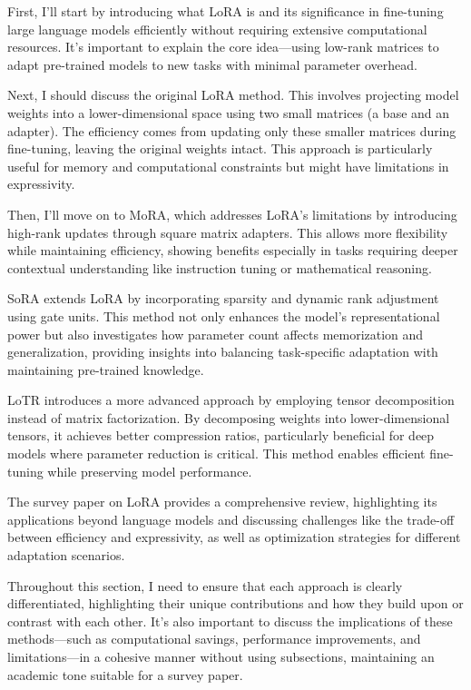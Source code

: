 \documentclass[conference]{IEEEtran}
\begin{document}
First, I'll start by introducing what LoRA is and its significance in fine-tuning large language models efficiently without requiring extensive computational resources. It's important to explain the core idea—using low-rank matrices to adapt pre-trained models to new tasks with minimal parameter overhead.

Next, I should discuss the original LoRA method. This involves projecting model weights into a lower-dimensional space using two small matrices (a base and an adapter). The efficiency comes from updating only these smaller matrices during fine-tuning, leaving the original weights intact. This approach is particularly useful for memory and computational constraints but might have limitations in expressivity.

Then, I'll move on to MoRA, which addresses LoRA's limitations by introducing high-rank updates through square matrix adapters. This allows more flexibility while maintaining efficiency, showing benefits especially in tasks requiring deeper contextual understanding like instruction tuning or mathematical reasoning.

SoRA extends LoRA by incorporating sparsity and dynamic rank adjustment using gate units. This method not only enhances the model's representational power but also investigates how parameter count affects memorization and generalization, providing insights into balancing task-specific adaptation with maintaining pre-trained knowledge.

LoTR introduces a more advanced approach by employing tensor decomposition instead of matrix factorization. By decomposing weights into lower-dimensional tensors, it achieves better compression ratios, particularly beneficial for deep models where parameter reduction is critical. This method enables efficient fine-tuning while preserving model performance.

The survey paper on LoRA provides a comprehensive review, highlighting its applications beyond language models and discussing challenges like the trade-off between efficiency and expressivity, as well as optimization strategies for different adaptation scenarios.

Throughout this section, I need to ensure that each approach is clearly differentiated, highlighting their unique contributions and how they build upon or contrast with each other. It's also important to discuss the implications of these methods—such as computational savings, performance improvements, and limitations—in a cohesive manner without using subsections, maintaining an academic tone suitable for a survey paper.
\end{document}
